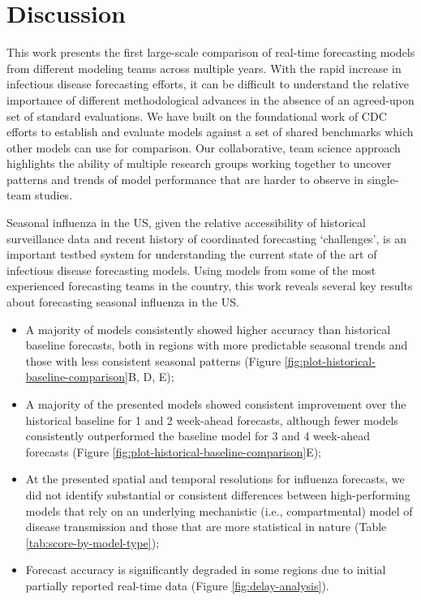 \documentclass[9pt,twocolumn,twoside]{pnas-new}\usepackage[]{graphicx}\usepackage[]{color}
\begin{document}





\section*{Discussion}

This work presents the first large-scale comparison of real-time forecasting models from different modeling teams across multiple years.
With the rapid increase in infectious disease forecasting efforts, it can be difficult to understand the relative importance of different methodological advances in the absence of an agreed-upon set of standard evaluations.
We have built on the foundational work of CDC efforts to establish and evaluate models against a set of shared benchmarks which other models can use for comparison.
Our collaborative, team science approach highlights the ability of multiple research groups working together to uncover patterns and trends of model performance that are harder to observe in single-team studies.

Seasonal influenza in the US, given the relative accessibility of historical surveillance data and recent history of coordinated forecasting `challenges', is an important testbed system for understanding the current state of the art of infectious disease forecasting models.
Using models from some of the most experienced forecasting teams in the country, this work reveals several key results about forecasting seasonal influenza in the US. 
\begin{itemize}
    \item A majority of models consistently showed higher accuracy than historical baseline forecasts, both in regions with more predictable seasonal trends and those with less consistent seasonal patterns (Figure \ref{fig:plot-historical-baseline-comparison}B, D, E);
    \item A majority of the presented models showed consistent improvement over the historical baseline for 1 and 2 week-ahead forecasts, although fewer models consistently outperformed the baseline model for 3 and 4 week-ahead forecasts (Figure \ref{fig:plot-historical-baseline-comparison}E);
    \item At the presented spatial and temporal resolutions for influenza forecasts, we did not identify substantial or consistent differences between high-performing models that rely on an underlying mechanistic (i.e., compartmental) model of disease transmission and those that are more statistical in nature (Table \ref{tab:score-by-model-type});
    \item Forecast accuracy is significantly degraded in some regions due to initial partially reported real-time data (Figure \ref{fig:delay-analysis}).
\end{itemize}
\end{document}
